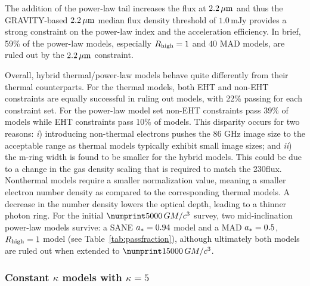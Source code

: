 
The addition of the power-law tail increases the flux at $2.2\,\mu\mathrm{m}$ and thus the GRAVITY-based $2.2\,\mu\mathrm{m}$ median flux density threshold of $1.0\,\mathrm{mJy}$ provides a strong constraint on the power-law index and the acceleration efficiency.
In brief, 59\% of the power-law models, especially $R_\mathrm{high}=1$ and $40$ MAD models, are ruled out by the $2.2\,\mu\mathrm{m}$ constraint.


Overall, \hamr hybrid thermal/power-law models behave quite differently from their thermal counterparts.
For the thermal models, both EHT and non-EHT constraints are equally successful in ruling out models, with 22\% passing for each constraint set. For the power-law model set non-EHT constraints pass 39\% of models while EHT constraints pass 10\% of models.
This disparity occurs for two reasons:
\emph{i}) introducing non-thermal electrons pushes the 86 GHz image size to the acceptable range as thermal models typically exhibit small image sizes; and
\emph{ii}) the m-ring width is found to be smaller for the hybrid models.
This could be due to a change in the gas density scaling that is required to match the 230\GHz flux.
Nonthermal models require a smaller normalization value, meaning a smaller electron number density as compared to the corresponding thermal models.
A decrease in the number density lowers the optical depth, leading to a thinner photon ring.
For the initial $\no{5000}\,\tg$ survey, two mid-inclination power-law models survive: a SANE $a_*=0.94$ model and a MAD $a_*=0.5$, $R_\mathrm{high}=1$ model (see Table~\ref{tab:passfraction}), although ultimately both models are ruled out when extended to $\no{15000}\,\tg$.

\subsubsection{Constant \texorpdfstring{$\kappa$}{kappa} models with \texorpdfstring{$\kappa = 5$}{kappa = 5}}
\label{sec:constant_kappa}

